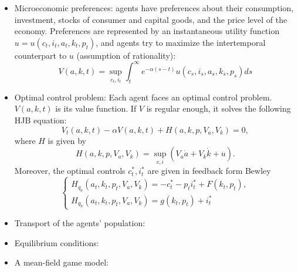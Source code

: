 \documentclass{article}
\begin{document}
\begin{itemize}
    \item Microeconomic preferences: agents have preferences about
    their consumption, investment, stocks of consumer and capital goods, and the price level
    of the economy.
    Preferences are represented by an instantaneous utility function
    $u = u(c_t,i_t,a_t,k_t,p_t)$, and agents try to maximize the intertemporal counterpart
    to $u$ (assumption of rationality):
    $$
    V(a,k,t) = \sup_{c_t,i_t} \int_t^\infty e^{-\alpha(s-t)} u(c_s,i_s,a_s,k_s,p_s) ds
    $$
    \item Optimal control problem: 
    Each agent faces an optimal control problem. $V(a,k,t)$ is its value function. 
    If $V$ is regular enough, it solves the following HJB equation:
    $$
    V_t(a,k,t) - \alpha V(a,k,t) + H(a,k,p,V_a,V_k) = 0,
    $$ 
    where $H$ is given by 
    $$
    H(a,k,p,V_a,V_k) = \sup_{c,i}\left( V_a {\dot a }+ V_k {\dot k} + u \right). $$
    Moreover, the optimal controls $c_t^*, i_t^*$ are given in feedback form Bewley
    $$
    \begin{cases}
        H_{q_a} (a_t, k_t, p_t, V_a, V_k) = - c_t^* - p_t i^*_t + F(k_t,p_t),\\
        H_{q_k} (a_t, k_t, p_t, V_a, V_k) = g(k_t, p_t) + i_t^*
    \end{cases}
    $$
    \item Transport of the agents' population:
    \item Equilibrium conditions:
    \item A mean-field game model: 
\end{itemize}
\end{document}
